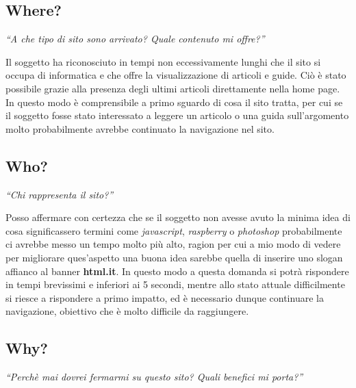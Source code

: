 \subsection{Where?}

\begin{center}

\textit{``A che tipo di sito sono arrivato? Quale contenuto mi offre?''}

\end{center}

Il soggetto ha riconosciuto in tempi non eccessivamente lunghi che il sito si occupa di informatica e che offre la visualizzazione di articoli e guide. Ciò è stato possibile grazie alla presenza degli ultimi articoli direttamente nella home page. In questo modo è comprensibile a primo sguardo di cosa il sito tratta, per cui se il soggetto fosse stato interessato a leggere un articolo o una guida sull'argomento molto probabilmente avrebbe continuato la navigazione nel sito.

\subsection{Who?}

\begin{center}

\textit{``Chi rappresenta il sito?''}

\end{center}

Posso affermare con certezza che se il soggetto non avesse avuto la minima idea di cosa significassero termini come \textit{javascript}, \textit{raspberry} o \textit{photoshop} probabilmente ci avrebbe messo un tempo molto più alto, ragion per cui a mio modo di vedere per migliorare ques'aspetto una buona idea sarebbe quella di inserire uno slogan affianco al banner \textbf{html.it}. In questo modo a questa domanda si potrà rispondere in tempi brevissimi e inferiori ai 5 secondi, mentre allo stato attuale difficilmente si riesce a rispondere a primo impatto, ed è necessario dunque continuare la navigazione, obiettivo che è molto difficile da raggiungere.

\subsection{Why?}

\begin{center}

\textit{``Perchè mai dovrei fermarmi su questo sito? Quali benefici mi porta?''}

\end{center}

